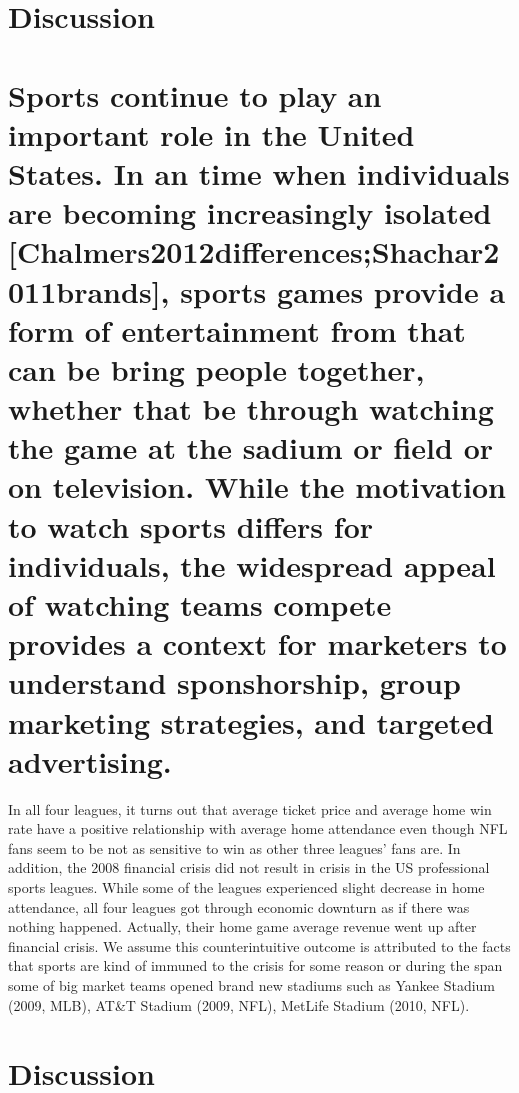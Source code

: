 \documentclass[man, fleqn, noextraspace,floatsintext]{apa6}
\begin{document}
\section{Discussion}\label{discussion}

\section{Sports continue to play an important role in the United States.
In an time when individuals are becoming increasingly isolated
{[}Chalmers2012differences;Shachar2011brands{]}, sports games provide a
form of entertainment from that can be bring people together, whether
that be through watching the game at the sadium or field or on
television. While the motivation to watch sports differs for
individuals, the widespread appeal of watching teams compete provides a
context for marketers to understand sponshorship, group marketing
strategies, and targeted
advertising.}\label{sports-continue-to-play-an-important-role-in-the-united-states.-in-an-time-when-individuals-are-becoming-increasingly-isolated-chalmers2012differencesshachar2011brands-sports-games-provide-a-form-of-entertainment-from-that-can-be-bring-people-together-whether-that-be-through-watching-the-game-at-the-sadium-or-field-or-on-television.-while-the-motivation-to-watch-sports-differs-for-individuals-the-widespread-appeal-of-watching-teams-compete-provides-a-context-for-marketers-to-understand-sponshorship-group-marketing-strategies-and-targeted-advertising.}

In all four leagues, it turns out that average ticket price and average
home win rate have a positive relationship with average home attendance
even though NFL fans seem to be not as sensitive to win as other three
leagues' fans are. In addition, the 2008 financial crisis did not result
in crisis in the US professional sports leagues. While some of the
leagues experienced slight decrease in home attendance, all four leagues
got through economic downturn as if there was nothing happened.
Actually, their home game average revenue went up after financial
crisis. We assume this counterintuitive outcome is attributed to the
facts that sports are kind of immuned to the crisis for some reason or
during the span some of big market teams opened brand new stadiums such
as Yankee Stadium (2009, MLB), AT\&T Stadium (2009, NFL), MetLife
Stadium (2010, NFL).

\section{Discussion}\label{discussion-1}
\end{document}
